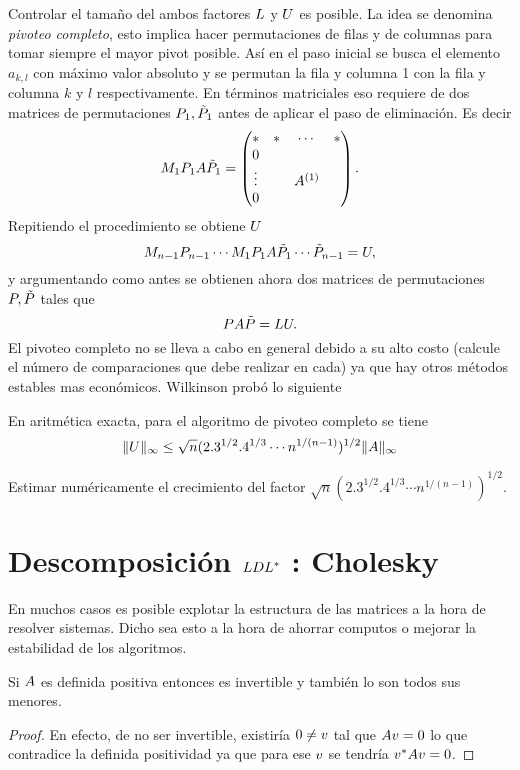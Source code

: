 \begin{tcolorbox}
Controlar el tamaño del ambos factores $\Lb$ y $\Ub$ es posible.
La idea se denomina \emph{pivoteo completo}, esto implica hacer permutaciones de filas y de columnas para tomar siempre el mayor pivot posible. Así en el paso inicial se busca el elemento $a_{k,l}$ con máximo valor absoluto y se permutan la fila y columna 1 con la fila y columna $k$ y $l$ respectivamente.  En términos matriciales eso requiere de dos matrices de permutaciones $\Pb_1,\tilde \Pb_1$ antes de aplicar el paso de eliminación. Es decir
$$
\Mb_1\Pb_1\Ab\tilde\Pb_1=
\begin{pmatrix}
 *&*&\cdots &*\\
 0&&&\\
  \vdots&&\Ab^{(1)}&\\
 0&&&\\

\end{pmatrix}.
$$
Repitiendo el procedimiento se obtiene $\Ub$
$$
\Mb_{n-1}\Pb_{n-1}\cdots \Mb_1\Pb_1\Ab\tilde\Pb_1\cdots \tilde\Pb_{n-1}=\Ub,
$$
y argumentando como antes se obtienen ahora dos matrices de permutaciones $\Pb,\tilde\Pb$ tales que
$$
\Pb\Ab\tilde\Pb=\Lb\Ub.
$$
El pivoteo completo no se lleva a cabo en general debido a su alto costo (calcule el número de comparaciones que debe realizar en cada) ya que hay otros métodos estables mas económicos. Wilkinson probó lo siguiente
\tcc
\begin{teorema}
 En aritmética exacta, para el algoritmo de pivoteo completo se tiene
 $$
 \|\Ub\|_{\infty}\le \sqrt{n}(2.3^{1/2}.4^{1/3}\cdots n^{1/(n-1)})^{1/2}\|\Ab\|_\infty
 $$
\end{teorema}
\etcc
\begin{ejercicio}
 Estimar numéricamente el crecimiento del factor
 $\sqrt{n}(2.3^{1/2}.4^{1/3}\cdots n^{1/(n-1)})^{1/2}$.
\end{ejercicio}

\section{Descomposición $\Lb \Db\Lb^*$ : Cholesky}


En muchos casos es posible explotar la estructura de las matrices a la hora de resolver sistemas. Dicho sea esto a la hora de ahorrar computos o mejorar la estabilidad de los algoritmos.


\begin{proposicion}
\label{prop:defposesinvert}
Si $\Ab$ es definida positiva entonces es invertible y también lo son todos sus menores.
\end{proposicion}
\begin{proof}
 En efecto, de no ser invertible, existiría $\cero\neq\vb$ tal que
 $\Ab\vb=\cero$ lo que contradice la definida positividad ya que para ese $\vb$ se tendría $\vb^*\Ab\vb=0$.


\end{proof}
\end{tcolorbox}
